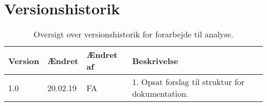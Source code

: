 \chapter{Versionshistorik}
\begin{table}[H] 
	\centering 
	\begin{tabular}{|p{1.5cm}|p{1.5cm}|p{2cm}|p{8cm}|}
		\hline
\textbf{Version} & \textbf{Ændret}  &  \textbf{Ændret af} &   \textbf{Beskrivelse}  \\ \hline
1.0 &   20.02.19 & FA & 1. Opsat forslag til struktur for dokumentation. \\ \hline
	\end{tabular}
	\caption{Oversigt over versionshistorik for forarbejde til analyse.}
	\label{tab:versionshistorik}
\end{table}
\FloatBarrier